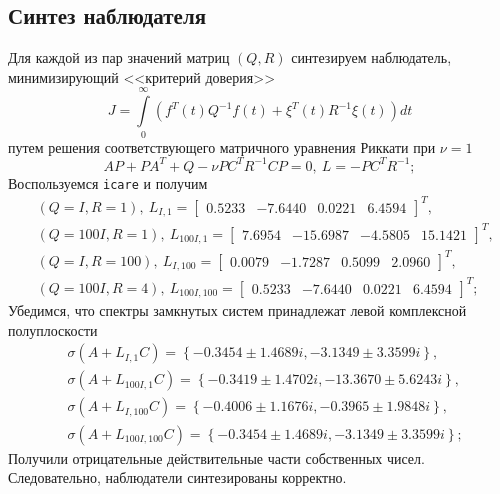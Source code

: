 \documentclass[a4paper, 12pt]{article}
\begin{document}
    \subsection{Синтез наблюдателя}
    Для каждой из пар значений матриц $\left( Q,R \right)$ синтезируем
    наблюдатель, минимизирующий <<критерий доверия>>
    $$
    J=\int\limits_{0}^{\infty}\left( f^T(t)Q^{-1}f(t)+\xi^T(t)R^{-1}\xi(t) \right)dt
    $$
    путем решения соответствующего матричного уравнения Риккати при $\nu=1$
    $$
    AP+PA^T+Q-\nu PC^TR^{-1}CP=0,\ L=-PC^TR^{-1};
    $$
    Воспользуемся \texttt{icare} и получим
    \begin{align*}
        &\left( Q=I, R=1 \right),\ L_{I,1}=\begin{bmatrix}
            0.5233  &-7.6440 &0.0221 &6.4594
        \end{bmatrix}^T,\\
        &\left( Q=100I, R=1 \right),\ L_{100I,1}=\begin{bmatrix}
            7.6954 &-15.6987 &-4.5805 &15.1421
        \end{bmatrix}^T,\\
        &\left( Q=I, R=100 \right),\ L_{I,100}=\begin{bmatrix}
            0.0079 &-1.7287 &0.5099 &2.0960
        \end{bmatrix}^T,\\
        &\left( Q=100I, R=4 \right),\ L_{100I,100}=\begin{bmatrix}
            0.5233  &-7.6440 &0.0221 &6.4594
        \end{bmatrix}^T;
    \end{align*}
    Убедимся, что спектры замкнутых систем принадлежат левой комплексной полуплоскости
    \begin{align*}
        &\sigma\left( A+L_{I,1}C \right)=\left\{ -0.3454\pm1.4689i, -3.1349\pm3.3599i \right\},\\
        &\sigma\left( A+L_{100I,1}C \right)=\left\{ -0.3419\pm1.4702i, -13.3670\pm5.6243i \right\},\\
        &\sigma\left( A+L_{I,100}C \right)=\left\{ -0.4006\pm1.1676i,-0.3965\pm1.9848i \right\},\\
        &\sigma\left( A+L_{100I,100}C \right)=\left\{ -0.3454\pm1.4689i, -3.1349\pm3.3599i \right\};
    \end{align*}
    Получили отрицательные действительные части собственных чисел.
    Следовательно, наблюдатели синтезированы корректно.
\end{document}
